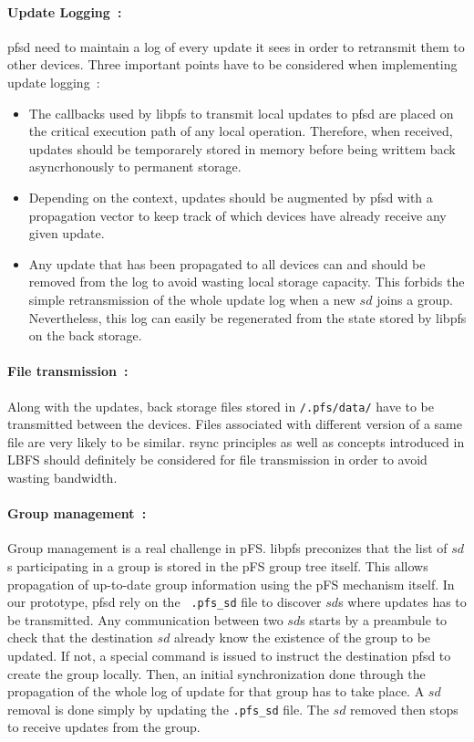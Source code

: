 \paragraph {Update Logging~:}
pfsd need to maintain a log of every update it sees in order to
retransmit them to other devices. Three important points have to be
considered when implementing update logging~:
\begin{itemize}
\item The callbacks used by libpfs to transmit local updates to pfsd are
  placed on the critical execution path of any local
  operation. Therefore, when received, updates should be temporarely
  stored in memory before being writtem back asyncrhonously to permanent
  storage.
\item Depending on the context, updates should be augmented by pfsd
  with a propagation vector to keep track of which devices have
  already receive any given update.
\item Any update that has been propagated to all devices can and
  should be removed from the log to avoid wasting local storage
  capacity. This forbids the simple retransmission of the whole update
  log when a new $sd$ joins a group. Nevertheless, this log can easily
  be regenerated from the state stored by libpfs on the back storage.
\end{itemize}

\paragraph {File transmission~:}
Along with the updates, back storage files stored in {\tt /.pfs/data/}
have to be transmitted between the devices. Files associated with
different version of a same file are very likely to be
similar. rsync\cite{tridgell:rsync} principles as well as concepts
introduced in LBFS\cite{muthitacharoen:lbfs} should definitely be
considered for file transmission in order to avoid wasting bandwidth.

\paragraph {Group management~:}
Group management is a real challenge in pFS. libpfs preconizes that the
list of $sd$s participating in a group is stored in the pFS group tree
itself. This allows propagation of up-to-date group information using
the pFS mechanism itself. In our prototype, pfsd rely on the {\tt
  .pfs\_sd} file to discover $sd$s where updates has to be
transmitted. Any communication between two $sd$s starts by a preambule
to check that the destination $sd$ already know the existence of the
group to be updated. If not, a special command is issued to instruct
the destination pfsd to create the group locally. Then, an initial
synchronization done through the propagation of the whole log of
update for that group has to take place. A $sd$ removal is done simply
by updating the {\tt .pfs\_sd} file. The $sd$ removed then stops to
receive updates from the group.

